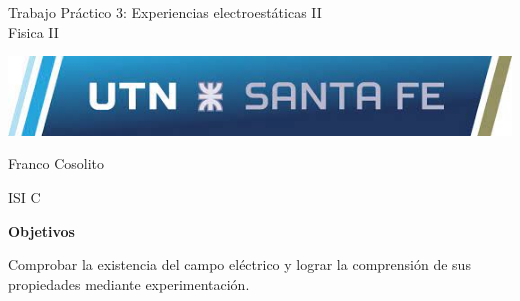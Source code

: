 \documentclass[11pt, letterpaper]{article}
\newcommand\vspt{15pt}
\newcommand\vsp{10pt}
\newcommand\tpn{3}
\newcommand\tptitle{Experiencias electroestáticas II}
\newcommand\tpsubj{Fisica II}
\begin{document}
\thispagestyle{empty}

\begin{center}\Huge{Trabajo Práctico \tpn: \tptitle\\
\vspace{\vspt}
\tpsubj}\end{center}

\vspace{\vspt}
\includegraphics[width=\linewidth]{utnlogo}

\vspace{\vspt}
\begin{center}\Huge{Franco Cosolito}\end{center}

\vspace{\vspt}
\begin{center}\Large{ISI C}\end{center}
\pagebreak

\setcounter{page}{1}
\begin{center}\textbf{Objetivos}\end{center}
    Comprobar la existencia del campo eléctrico y lograr la comprensión de sus 
    propiedades mediante experimentación.
\vspace{\vsp}
\end{document}
